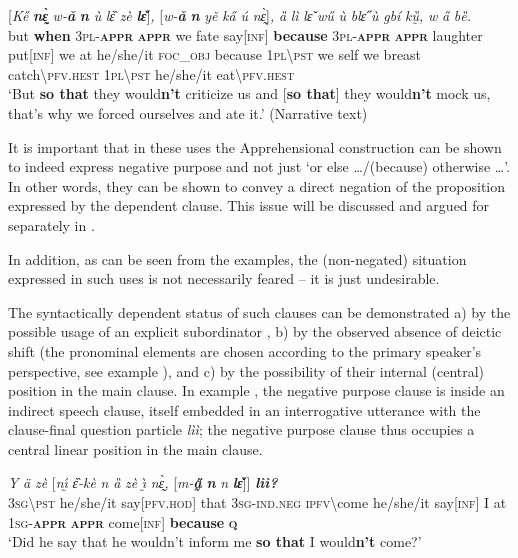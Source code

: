 \documentclass[output=paper,colorlinks,citecolor=brown]{langscibook}
\begin{document}
\ea \label{ex:Fed58}
\gll \textup{[}\textit{Ke̋} \textit{\textbf{nɛ̰̀}} \textit{w-\textbf{ǎ}} \textit{\textbf{n{\ù}}} \textit{ù} \textit{lɛ̏} \textit{zè} \textit{\textbf{lɛ̌}}\textup{]}\textit{,} \textup{[}\textit{w-\textbf{ǎ}} \textit{\textbf{n{\ù}}} \textit{yě} \textit{ka̋} \textit{ú} \textit{nɛ̰̀}\textup{]}\textit{,} \textit{ȁ} \textit{lì} \textit{lɛ̌} \textit{wű} \textit{ù} \textit{blɛ̋} \textit{ù} \textit{gbí} \textit{kṵ̏,} \textit{w} \textit{a̋} \textit{bȅ.} \\
but \textbf{when} \textsc{3pl-\textbf{appr}} \textsc{\textbf{appr}} we fate say[\textsc{inf}] \textbf{because} \textsc{3pl-\textbf{appr}} \textsc{\textbf{appr}} laughter put[\textsc{inf}] we at he/she/it \textsc{foc\_obj} because \textsc{1pl\backslash pst} we self we breast catch\backslash\textsc{pfv.hest} \textsc{1pl\backslash pst} he/she/it eat\backslash\textsc{pfv.hest} \\
\glt `But \textbf{so that} they would\textbf{n't} criticize us and [\textbf{so that}] they would\textbf{n't} mock us, that's why we forced ourselves and ate it.' (Narrative text)
\z


It is important that in these uses the Apprehensional construction can be shown to indeed express negative purpose and not just `or else {\dots}\slash (because) otherwise {\dots}'. In other words, they can be shown to convey a direct negation of the proposition expressed by the dependent clause. This issue will be discussed and argued for separately in .

In addition, as can be seen from the examples, the (non-negated) situation expressed in such uses is not necessarily feared -- it is just undesirable.

The syntactically dependent status of such clauses can be demonstrated a) by the possible usage of an explicit subordinator , b) by the observed absence of deictic shift (the pronominal elements are chosen according to the primary speaker's perspective, see example ), and c) by the possibility of their internal (central) position in the main clause. In example , the negative purpose clause is inside an indirect speech clause, itself embedded in an interrogative utterance with the clause-final question particle \textit{lìì}; the negative purpose clause thus occupies a central linear position in the main clause.

\ea \label{ex:Fed59}
\gll \textit{Y} \textit{ä} \textit{zè} \textup{[}\textit{nı̰́} \textit{ɛ̏-kè} \textit{n{\ù}} \textit{ȁ} \textit{zè} \textit{ı̰̀} \textit{nɛ̰̀,} \textup{[}\textit{m-\textbf{a̰̋}} \textit{\textbf{n{\ù}}} \textit{n{\ù}} \textit{\textbf{lɛ̌}}\textup{]]} \textit{\textbf{lìì?}} \\
\textsc{3sg\backslash pst} he/she/it say[\textsc{pfv.hod}] that \textsc{3sg-ind.neg} \textsc{ipfv\backslash}come he/she/it say[\textsc{inf}] I at \textsc{1sg-\textbf{appr}} \textsc{\textbf{appr}} come[\textsc{inf}] \textbf{because} \textsc{\textbf{q}} \\
\glt `Did he say that he wouldn't inform me \textbf{so that} I would\textbf{n't} come?'
\z
\end{document}
